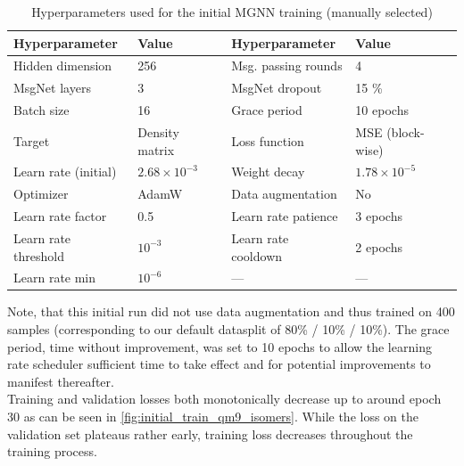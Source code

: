 \begin{table}[H]
    \centering
    \caption{Hyperparameters used for the initial MGNN training (manually selected)}
    \label{tab:init_hparams}
    \begin{tabular}{ll ll}
        \toprule
        \textbf{Hyperparameter} & \textbf{Value} & \textbf{Hyperparameter} & \textbf{Value} \\
        \midrule
        Hidden dimension & 256 & Msg. passing rounds & 4 \\
        MsgNet layers & 3 & MsgNet dropout & 15 \% \\
        Batch size & 16 & Grace period & 10 epochs \\
        Target & Density matrix & Loss function & MSE (block-wise) \\
        Learn rate (initial) & $2.68 \times 10^{-3}$ & Weight decay & $1.78 \times 10^{-5}$ \\
        Optimizer & AdamW & Data augmentation & No \\
        \midrule
        Learn rate factor & 0.5 & Learn rate patience & 3 epochs \\
        Learn rate threshold & $10^{-3}$ & Learn rate cooldown & 2 epochs \\
        Learn rate min & $10^{-6}$ & — & — \\
        \bottomrule
    \end{tabular}
\end{table}
Note, that this initial run did not use data augmentation and thus trained on 400 samples (corresponding to our default datasplit of 80\% / 10\% / 10\%). The grace period, time without improvement, was set to 10 epochs to allow the learning rate scheduler sufficient time to take effect and for potential improvements to manifest thereafter.\\
Training and validation losses both monotonically decrease up to around epoch 30 as can be seen in \autoref{fig:initial_train_qm9_isomers}. While the loss on the validation set plateaus rather early, training loss decreases throughout the training process. 

